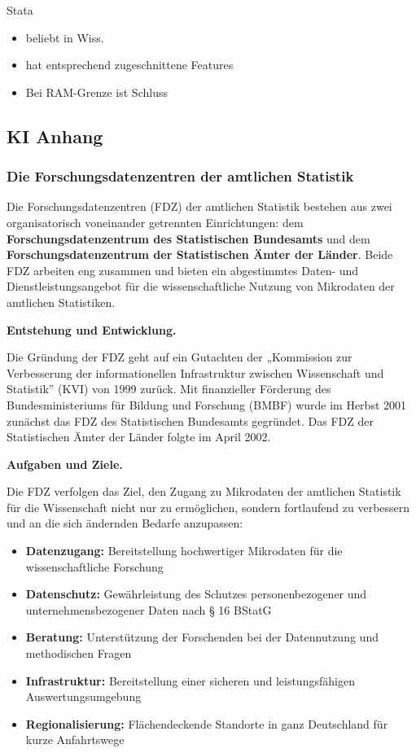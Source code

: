 \documentclass[
  german,
  10pt,
  twoside]{article}
\providecommand{\tightlist}{%
  \setlength{\itemsep}{0pt}\setlength{\parskip}{0pt}}
\begin{document}
Stata

\begin{itemize}
\tightlist
\item
  beliebt in Wiss.
\item
  hat entsprechend zugeschnittene Features
\item
  Bei RAM-Grenze ist Schluss
\end{itemize}

\subsection{KI Anhang}\label{ki-anhang}

\subsubsection{Die Forschungsdatenzentren der amtlichen
Statistik}\label{die-forschungsdatenzentren-der-amtlichen-statistik}

Die Forschungsdatenzentren (FDZ) der amtlichen Statistik bestehen aus
zwei organisatorisch voneinander getrennten Einrichtungen: dem
\textbf{Forschungsdatenzentrum des Statistischen Bundesamts} und dem
\textbf{Forschungsdatenzentrum der Statistischen Ämter der Länder}.
Beide FDZ arbeiten eng zusammen und bieten ein abgestimmtes Daten- und
Dienstleistungsangebot für die wissenschaftliche Nutzung von Mikrodaten
der amtlichen Statistiken.

\textbf{Entstehung und Entwicklung.}

Die Gründung der FDZ geht auf ein Gutachten der „Kommission zur
Verbesserung der informationellen Infrastruktur zwischen Wissenschaft
und Statistik'' (KVI) von 1999 zurück. Mit finanzieller Förderung des
Bundesministeriums für Bildung und Forschung (BMBF) wurde im Herbst 2001
zunächst das FDZ des Statistischen Bundesamts gegründet. Das FDZ der
Statistischen Ämter der Länder folgte im April 2002.

\textbf{Aufgaben und Ziele.}

Die FDZ verfolgen das Ziel, den Zugang zu Mikrodaten der amtlichen
Statistik für die Wissenschaft nicht nur zu ermöglichen, sondern
fortlaufend zu verbessern und an die sich ändernden Bedarfe anzupassen:

\begin{itemize}
\tightlist
\item
  \textbf{Datenzugang:} Bereitstellung hochwertiger Mikrodaten für die
  wissenschaftliche Forschung
\item
  \textbf{Datenschutz:} Gewährleistung des Schutzes personenbezogener
  und unternehmensbezogener Daten nach § 16 BStatG
\item
  \textbf{Beratung:} Unterstützung der Forschenden bei der Datennutzung
  und methodischen Fragen
\item
  \textbf{Infrastruktur:} Bereitstellung einer sicheren und
  leistungsfähigen Auswertungsumgebung
\item
  \textbf{Regionalisierung:} Flächendeckende Standorte in ganz
  Deutschland für kurze Anfahrtswege
\end{itemize}
\end{document}
